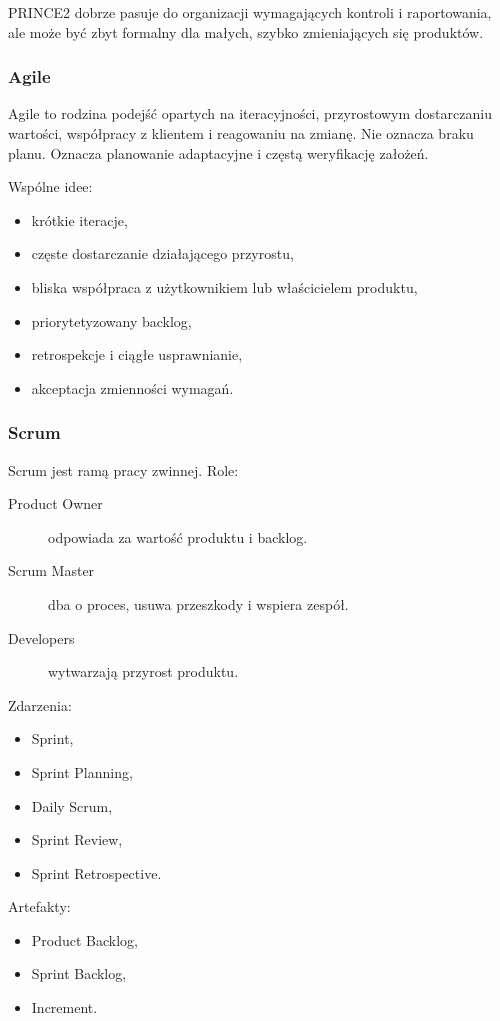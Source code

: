 PRINCE2 dobrze pasuje do organizacji wymagających kontroli i raportowania, ale może być zbyt formalny dla małych, szybko zmieniających się produktów.

\subsubsection{Agile}

Agile to rodzina podejść opartych na iteracyjności, przyrostowym dostarczaniu wartości, współpracy z klientem i reagowaniu na zmianę. Nie oznacza braku planu. Oznacza planowanie adaptacyjne i częstą weryfikację założeń.

Wspólne idee:
\begin{itemize}
  \item krótkie iteracje,
  \item częste dostarczanie działającego przyrostu,
  \item bliska współpraca z użytkownikiem lub właścicielem produktu,
  \item priorytetyzowany backlog,
  \item retrospekcje i ciągłe usprawnianie,
  \item akceptacja zmienności wymagań.
\end{itemize}

\subsubsection{Scrum}

Scrum jest ramą pracy zwinnej. Role:
\begin{description}
  \item[Product Owner] odpowiada za wartość produktu i backlog.
  \item[Scrum Master] dba o proces, usuwa przeszkody i wspiera zespół.
  \item[Developers] wytwarzają przyrost produktu.
\end{description}

Zdarzenia:
\begin{itemize}
  \item Sprint,
  \item Sprint Planning,
  \item Daily Scrum,
  \item Sprint Review,
  \item Sprint Retrospective.
\end{itemize}

Artefakty:
\begin{itemize}
  \item Product Backlog,
  \item Sprint Backlog,
  \item Increment.
\end{itemize}

